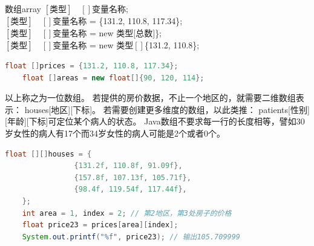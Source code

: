 \begin{definition}{数组}{array}
	$[\text{类型}]\quad[]$变量名称;\\
	$[\text{类型}]\quad[]$变量名称 = \{131.2, 110.8, 117.34\};\\
	$[\text{类型}]\quad[]$变量名称 = new 类型$[$总数$]$\};\\
	$[\text{类型}]\quad[]$变量名称 = new 类型$[]$\{131.2, 110.8\};
\end{definition}

\begin{lstlisting}[language=java]
	float []prices = {131.2, 110.8, 117.34};
	float []areas = new float[]{90, 120, 114};
\end{lstlisting}

\bigskip

以上称之为一位数组。
若提供的房价数据，不止一个地区的，就需要二维数组表示：
houses[地区][下标]。
若需要创建更多维度的数组，以此类推：
patients[性别][年龄][下标]可定位某个病人的状态。
Java数组不要求每一行的长度相等，譬如30岁女性的病人有17个而34岁女性的病人可能是2个或者0个。

\begin{lstlisting}[language=java]
	float [][]houses = {
				{131.2f, 110.8f, 91.09f},
				{157.8f, 107.13f, 105.71f},
				{98.4f, 119.54f, 117.44f},
	};
	int area = 1, index = 2; // 第2地区，第3处房子的价格
	float price23 = prices[area][index];
	System.out.printf("%f", price23); // 输出105.709999
\end{lstlisting}

\bigskip

